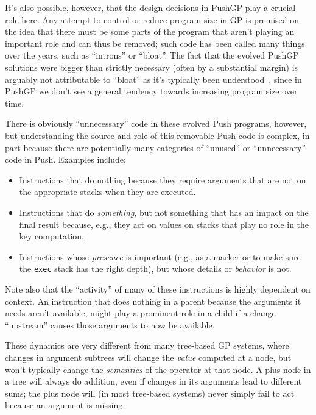 It's also possible,
however, that the design decisions in PushGP play a crucial role here. Any
attempt to control or reduce program size in GP is premised on the idea that
there must be some parts of the program that aren't playing an important role
and can thus be removed; such code has been called many things over the years,
such as ``introns'' or ``bloat''. The fact that the evolved PushGP solutions
were bigger than strictly necessary (often by a substantial margin) is arguably
not attributable to ``bloat'' as it's typically been 
understood~\cite{poli08:fieldguide}, since in PushGP we don't see a 
general tendency towards increasing program size over time. 

There is obviously ``unnecessary'' code in these evolved Push programs, 
however, but understanding the source and role of this removable Push 
code is complex, in part because there are potentially many categories 
of ``unused'' or ``unnecessary'' code
in Push. Examples include:
\begin{itemize}
	\item Instructions that do nothing because they require arguments 
	that are not on the appropriate stacks when they are executed. 
	\item Instructions that do \emph{something}, but not something that has an 
	impact on the final result because, e.g., they act on values on stacks 
	that play no role in the key computation. 
	\item Instructions whose \emph{presence} is important (e.g., as a marker 
	or to make sure the \texttt{exec} stack has the right depth), but 
	whose details or \emph{behavior} is not.
\end{itemize}
Note also that the ``activity'' of many of these instructions is highly
dependent on context. An instruction that does nothing in a parent because
the arguments it needs aren't available, might play a prominent role in a
child if a change ``upstream'' causes those arguments to now be available.

These dynamics are very different from many tree-based GP systems, where
changes in argument subtrees will change the \emph{value} computed at a 
node, but won't typically change the \emph{semantics} of the operator at that
node. A plus node in a tree will always do addition, even if changes in its
arguments lead to different sums; the plus node will (in most tree-based
systems) never simply fail to act because an argument is missing.

